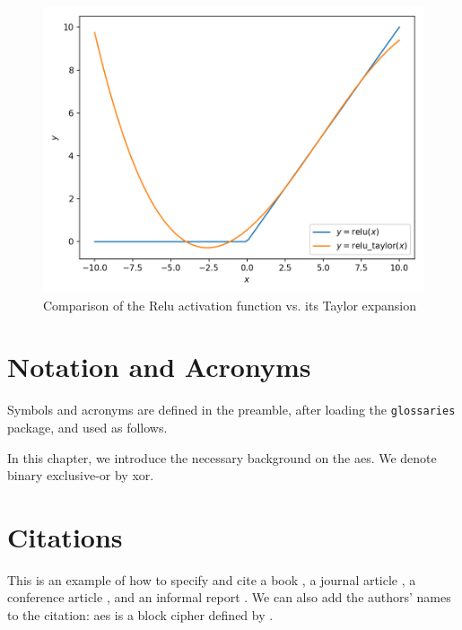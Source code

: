 \begin{figure}[H]
    \centering
    \includegraphics[width=0.8\linewidth]{figures/taylor-relu.png}
    \caption{Comparison of the Relu activation function vs. its Taylor expansion}
\end{figure}

\section{Notation and Acronyms}
\label{sec:gloss}
Symbols and acronyms are defined in the preamble, after loading the \texttt{glossaries} package, and used as follows.

In this chapter, we introduce the necessary background on the \gls{aes}.
We denote binary exclusive-or by \gls{xor}.

\section{Citations}
\label{sec:bib}
This is an example of how to specify and cite
a book \cite{AESbook},
a journal article \cite{bstjShannon49},
a conference article \cite{spKocherHFGGHHLM019},
and an informal report \cite{iacrSchneierFKR15}.
We can also add the authors' names to the citation:
\Gls{aes} is a block cipher defined by \textcite{AESbook}.
